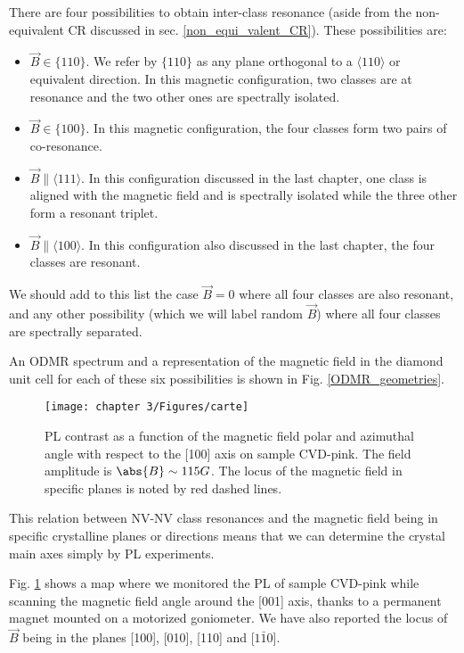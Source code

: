 \documentclass[a4paper, 11pt]{report}
\begin{document}
There are four possibilities to obtain inter-class resonance (aside from the non-equivalent CR discussed in sec. \ref{non_equi_valent_CR}). These possibilities are:
\begin{itemize}
\item $\vec{B} \in \{110\}$. We refer by $\{110\}$ as any plane orthogonal to a $\langle 110 \rangle$ or equivalent direction. In this magnetic configuration, two classes are at resonance and the two other ones are spectrally isolated.
\item $\vec{B} \in \{100\}$. In this magnetic configuration, the four classes form two pairs of co-resonance.
\item $\vec{B} \parallel \langle 111 \rangle$. In this configuration discussed in the last chapter, one class is aligned with the magnetic field and is spectrally isolated while the three other form a resonant triplet.
\item $\vec{B} \parallel \langle 100 \rangle$. In this configuration also discussed in the last chapter, the four classes are resonant.
\end{itemize}
We should add to this list the case $\vec{B}=0$ where all four classes are also resonant, and any other possibility (which we will label random $\vec{B}$) where all four classes are spectrally separated. 

An ODMR spectrum and a representation of the magnetic field in the diamond unit cell for each of these six possibilities is shown in Fig. \ref{ODMR_geometries}.

\begin{figure}[h]
\centering
\texttt{[image: chapter 3/Figures/carte]}
\caption{PL contrast as a function of the magnetic field polar and azimuthal angle with respect to the [100] axis on sample CVD-pink. The field amplitude is $\abs{B} \sim 115 G$. The locus of the magnetic field in specific planes is noted by red dashed lines.}
\label{Carte}
\end{figure}

This relation between NV-NV class resonances and the magnetic field being in specific crystalline planes or directions means that we can determine the crystal main axes simply by PL experiments.

Fig. \ref{Carte} shows a map where we monitored the PL of sample CVD-pink while scanning the magnetic field angle around the [001] axis, thanks to a permanent magnet mounted on a motorized goniometer. We have also reported the locus of $\vec{B}$ being in the planes [100], [010], [110] and [$1\bar 1 0$].
\end{document}
